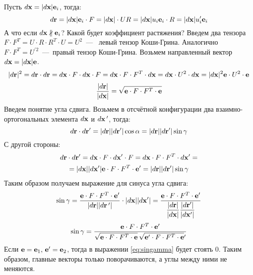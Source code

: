 \documentclass[a4papper, 14pt]{book}
\newcommand{\mf}[1]{\ensuremath\mathbf{#1}}
\theoremstyle{plain} %
\theoremstyle{definition} %
\theoremstyle{remark} %
\begin{document}
	Пусть $d\mf{x} = \vert d\mf{x}\vert\mf{e}_i$, тогда:
	\begin{equation}
	d\mf{r} = \vert d\mf{x}\vert \mf{e}_i \cdot F = \vert d\mf{x}\vert \cdot UR 
	=\vert d\mf{x}\vert u_i \mf{e}_i\cdot R = \vert d\mf{x}\vert u_i^{\prime} \mf{e}_i
	\end{equation}
	А что если $d\mf{x}\nparallel\mf{e}_i$? Какой будет коэффициент растяжения? Введем два тензора $F\cdot F^T = U\cdot R \cdot R^T \cdot U = U^2$~---~ левый тензор Коши-Грина. Аналогично $F\cdot F^T = U^{\prime 2}$~---~правый тензор Коши-Грина. Возьмем направленный вектор $d\mf{x} = \vert d\mf{x}\vert\mf{e}$. 
	\begin{equation}
	\vert d\mf{r}\vert^2 = d\mf{r}\cdot d\mf{r} = d\mf{x}\cdot F\cdot d\mf{x}\cdot F  = d\mf{x}\cdot F\cdot F^T \cdot d\mf{x} = d\mf{x}\cdot U^2 \cdot d\mf{x} = \vert d\mf{x}\vert^2 \mf{e}\cdot U^2 \cdot \mf{e}
	\end{equation}
	\begin{equation}
	\dfrac{\vert d\mf{r}\vert}{\vert d\mf{x}\vert} = \sqrt{\mf{e}\cdot F\cdot F^T\cdot \mf{e}}
	\end{equation}
	Введем понятие угла сдвига. Возьмем в отсчётной конфигурации два взаимно-ортогональных элемента $d\mf{x}$ и $d\mf{x}{\,^\prime}$, тогда:
	\begin{equation}
	d\mf{r}\cdot d\mf{r}^{\prime} = \vert d\mf{r}\vert \vert d\mf{r}^{\prime}\vert\cos\alpha= \vert d\mf{r}\vert \vert d\mf{r}^{\prime}\vert\sin\gamma
	\end{equation}
	С другой стороны:
	\begin{multline}
	d\mf{r}\cdot d\mf{r}^{\prime} = d\mf{x}\cdot F\cdot d\mf{x}^{\prime}\cdot F  = d\mf{x}\cdot F\cdot F^T \cdot d\mf{x}^{\prime} =\\
	= \vert d\mf{x}\vert\vert d\mf{x}^{\prime}\vert\mf{e}\cdot F\cdot F^T\cdot \mf{e}^{\prime} = \vert d\mf{r}\vert \vert d\mf{r}^{\prime}\vert\sin\gamma
	\end{multline}
	Таким образом получаем выражение для синуса угла сдвига:
	\begin{equation}
	\sin\gamma = \dfrac{\mf{e}\cdot F \cdot F^T \cdot \mf{e}^{\prime}}{\vert d\mf{r} \vert\vert d\mf{r}{ \,^\prime}\vert} \cdot \vert d\mf{x}\vert\vert d\mf{x}^{\prime}\vert =  \dfrac{\mf{e}\cdot F \cdot F^T \cdot \mf{e}^{\prime}}{\dfrac{\vert d\mf{r} \vert}{\vert d\mf{x}\vert}\dfrac{\vert d\mf{r}^{\prime}\vert}{\vert d\mf{x}^{\prime}\vert}}
	\end{equation}
	\begin{equation}\label{eq:singamma}
	\sin\gamma = \dfrac{\mf{e}\cdot F \cdot F^T \cdot\mf{e}^{\prime}}{\sqrt{\mf{e}\cdot F\cdot F^T\cdot \mf{e}}\,\sqrt{\mf{e}{^\prime}\cdot F\cdot F^T\cdot \mf{e}}{^\prime}}
	\end{equation}
	Если $\mf{e} = \mf{e}_1,\,\mf{e}{^\prime}=\mf{e}_2 $, тогда в выражении \eqref{eq:singamma} будет стоять 0. Таким образом, главные векторы только поворачиваются, а углы между ними не меняются. \\
	
\end{document}
